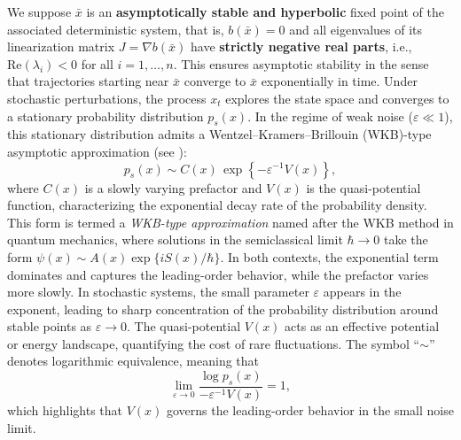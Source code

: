 \documentclass[11pt]{article}
\theoremstyle{plain}      %
\theoremstyle{definition} %
\begin{document}
We suppose $\bar{x}$ is an \textbf{asymptotically stable and hyperbolic} fixed point of the associated deterministic system, that is, $b(\bar{x}) = 0$ and all eigenvalues of its linearization matrix $J = \nabla b(\bar{x})$ have \textbf{strictly negative real parts}, i.e., $\text{Re}(\lambda_i) < 0$ for all $i = 1,\ldots,n$. This ensures asymptotic stability in the sense that trajectories starting near $\bar{x}$ converge to $\bar{x}$ exponentially in time. Under stochastic perturbations, the process $x_t$ explores the state space and converges to a stationary probability distribution $p_s(x)$. In the regime of weak noise ($\varepsilon \ll 1$), this stationary distribution admits a Wentzel--Kramers--Brillouin (WKB)-type asymptotic approximation (see \cite{chen2017singularities,li2022machine,smelyanskiy1997topological}):
\begin{equation}
\label{WKB}
p_s(x) \sim C(x)\, \exp\left\{-\varepsilon^{-1} V(x)\right\},
\end{equation}
where \( C(x) \) is a slowly varying prefactor and \( V(x) \) is the quasi-potential function, characterizing the exponential decay rate of the probability density. This form is termed a \emph{WKB-type approximation} named after the WKB method in quantum mechanics, where solutions in the semiclassical limit \( \hbar \to 0 \) take the form \( \psi(x) \sim A(x)\exp\{i S(x)/\hbar\} \). In both contexts, the exponential term dominates and captures the leading-order behavior, while the prefactor varies more slowly. In stochastic systems, the small parameter \( \varepsilon \) appears in the exponent, leading to sharp concentration of the probability distribution around stable points as \( \varepsilon \to 0 \). The quasi-potential \( V(x) \) acts as an effective potential or energy landscape, quantifying the cost of rare fluctuations. The symbol ``\( \sim \)'' denotes logarithmic equivalence, meaning that
\[
\lim_{\varepsilon \to 0} \frac{\log p_s(x)}{-\varepsilon^{-1} V(x)} = 1,
\]
which highlights that \( V(x) \) governs the leading-order behavior in the small noise limit.
\end{document}

